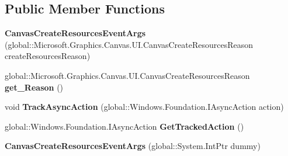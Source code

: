 \subsection*{Public Member Functions}
\begin{DoxyCompactItemize}
\item 
\mbox{\label{class_microsoft_1_1_graphics_1_1_canvas_1_1_u_i_1_1_canvas_create_resources_event_args_a82b174b6991b45dae81601265385770c}} 
{\bfseries Canvas\+Create\+Resources\+Event\+Args} (global\+::\+Microsoft.\+Graphics.\+Canvas.\+U\+I.\+Canvas\+Create\+Resources\+Reason create\+Resources\+Reason)
\item 
\mbox{\label{class_microsoft_1_1_graphics_1_1_canvas_1_1_u_i_1_1_canvas_create_resources_event_args_ac34effc43e4224c4a19ddd6ff7883c3d}} 
global\+::\+Microsoft.\+Graphics.\+Canvas.\+U\+I.\+Canvas\+Create\+Resources\+Reason {\bfseries get\+\_\+\+Reason} ()
\item 
\mbox{\label{class_microsoft_1_1_graphics_1_1_canvas_1_1_u_i_1_1_canvas_create_resources_event_args_af4082e3d50efdfe88607e77abbf80871}} 
void {\bfseries Track\+Async\+Action} (global\+::\+Windows.\+Foundation.\+I\+Async\+Action action)
\item 
\mbox{\label{class_microsoft_1_1_graphics_1_1_canvas_1_1_u_i_1_1_canvas_create_resources_event_args_adc12f96f4bcb8711da14472092a38891}} 
global\+::\+Windows.\+Foundation.\+I\+Async\+Action {\bfseries Get\+Tracked\+Action} ()
\item 
\mbox{\label{class_microsoft_1_1_graphics_1_1_canvas_1_1_u_i_1_1_canvas_create_resources_event_args_ae98b263ce96e012c6c79fb507af1887e}} 
{\bfseries Canvas\+Create\+Resources\+Event\+Args} (global\+::\+System.\+Int\+Ptr dummy)
\item 
\mbox{\label{class_microsoft_1_1_graphics_1_1_canvas_1_1_u_i_1_1_canvas_create_resources_event_args_a82b174b6991b45dae81601265385770c}} 

\end{DoxyCompactItemize}
